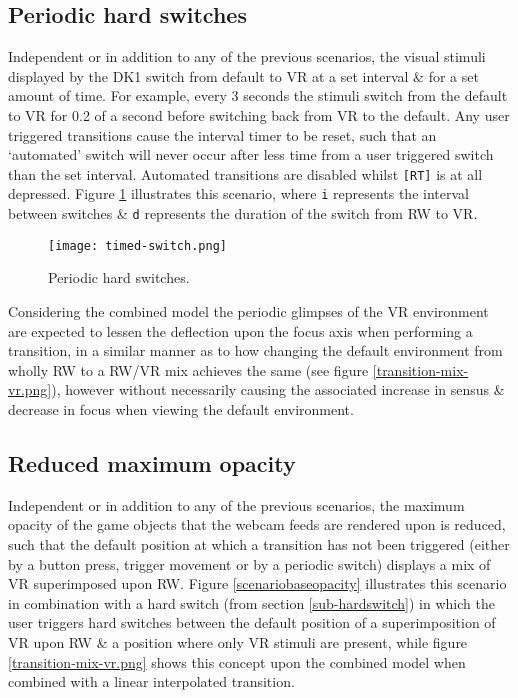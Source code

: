 


\subsection{Periodic hard switches}
\label{subsub-periodic}
Independent or in addition to any of the previous scenarios, the visual stimuli displayed by the DK1 switch from default to VR at a set interval \& for a set amount of time. For example, every 3 seconds the stimuli switch from the default to VR for 0.2 of a second before switching back from VR to the default. Any user triggered transitions cause the interval timer to be reset, such that an `automated' switch will never occur after less time from a user triggered switch than the set interval. Automated transitions are disabled whilst \texttt{[RT]} is at all depressed. Figure \ref{scenariotimed} illustrates this scenario, where \texttt{i} represents the interval between switches \& \texttt{d} represents the duration of the switch from RW to VR.

\begin{figure}[h]
	\begin{center}
		\texttt{[image: timed-switch.png]}
		\caption{Periodic hard switches.}
		\label{scenariotimed}
	\end{center}
\end{figure}

Considering the combined model the periodic glimpses of the VR environment are expected to lessen the deflection upon the focus axis when performing a transition, in a similar manner as to how changing the default environment from wholly RW to a RW/VR mix achieves the same (see figure \ref{transition-mix-vr.png}), however without necessarily causing the associated increase in sensus \& decrease in focus when viewing the default environment.


\subsection{Reduced maximum opacity}
\label{subsub-baseopacity}
Independent or in addition to any of the previous scenarios, the maximum opacity of the game objects that the webcam feeds are rendered upon is reduced, such that the default position at which a transition has not been triggered (either by a button press, trigger movement or by a periodic switch) displays a mix of VR superimposed upon RW. Figure \ref{scenariobaseopacity} illustrates this scenario in combination with a hard switch (from section \ref{sub-hardswitch}) in which the user triggers hard switches between the default position of a superimposition of VR upon RW \& a position where only VR stimuli are present, while figure \ref{transition-mix-vr.png} shows this concept upon the combined model when combined with a linear interpolated transition.

